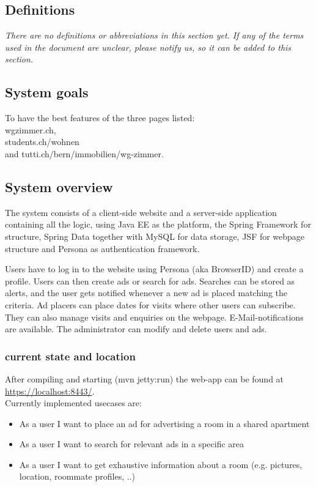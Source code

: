 \documentclass[a4wide]{article}
\begin{document}
\subsection{Definitions}
\textit{There are no definitions or abbreviations in this section yet. If any of the terms used in the document are unclear, please notify us, so it can be added to this section.}
\subsection{System goals}
To have the best features of the three pages listed: \\
wgzimmer.ch, \\
students.ch/wohnen \\
and tutti.ch/bern/immobilien/wg-zimmer.

\subsection{System overview}
The system consists of a client-side website and a server-side application containing all the logic, using Java EE as the platform, the Spring Framework for structure, Spring Data together with MySQL for data storage, JSF for webpage structure and Persona as authentication framework.

Users have to log in to the website using Persona (aka BrowserID) and create a profile. Users can then create ads or search for ads. Searches can be stored as alerts, and the user gets notified whenever a new ad is placed matching the criteria. Ad placers can place dates for visits where other users can subscribe. They can also manage visits and enquiries on the webpage. E-Mail-notifications are available.
The administrator can modify and delete users and ads.

\subsubsection{current state and location}
After compiling and starting (mvn jetty:run) the web-app can be found at \href{https://localhost:8443/}{https://localhost:8443/}.\\
Currently implemented usecases are: 
\begin{itemize}
\item As a user I want to place an ad for advertising a room in a shared apartment
\item As a user I want to search for relevant ads in a specific area
\item As a user I want to get exhaustive information about a room (e.g. pictures, location, roommate profiles, ..)
\end{itemize}
\end{document}

